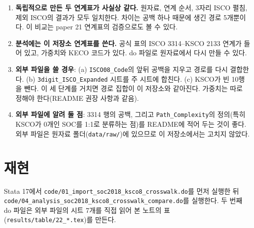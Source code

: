 \documentclass[11pt]{article}
\begin{document}
\begin{enumerate}[leftmargin=*]
  \item \textbf{독립적으로 만든 두 연계표가 사실상 같다.} 원자료, 연계 순서, 3자리 ISCO 펼침, 제외 ISCO의 결과가 모두 일치한다. 차이는 공백 하나 때문에 생긴 경로 5개뿐이다. 이 비교는 paper 21 연계표의 검증으로도 볼 수 있다.
  \item \textbf{분석에는 이 저장소 연계표를 쓴다.} 공식 표의 ISCO 3314–KSCO 2133 연계가 들어 있고, 가중치와 KECO 코드가 있다. do 파일로 원자료에서 다시 만들 수 있다.
  \item \textbf{외부 파일을 쓸 경우}: (a) \texttt{ISCO08\_Code}의 앞뒤 공백을 지우고 경로를 다시 결합한다. (b) \texttt{3digit\_ISCO\_Expanded} 시트를 주 시트에 합친다. (c) KSCO가 빈 10행을 뺀다. 이 세 단계를 거치면 경로 집합이 이 저장소와 같아진다. 가중치는 따로 정해야 한다(README 권장 사항과 같음).
  \item \textbf{외부 파일에 알려 둘 점}: 3314 행의 공백, 그리고 \texttt{Path\_Complexity}의 정의(특히 KSCO가 0개인 SOC를 1:1로 분류하는 점)를 README에 적어 두는 것이 좋다. 외부 파일은 원자료 폴더(\texttt{data/raw/})에 있으므로 이 저장소에서는 고치지 않았다.
\end{enumerate}

\section{재현}

Stata 17에서 \texttt{code/01\_import\_soc2018\_ksco8\_crosswalk.do}를 먼저 실행한 뒤 \texttt{code/04\_analysis\_soc2018\_ksco8\_crosswalk\_compare.do}를 실행한다. 두 번째 do 파일은 외부 파일의 시트 7개를 직접 읽어 본 노트의 표(\texttt{results/table/22\_*.tex})를 만든다.
\end{document}

